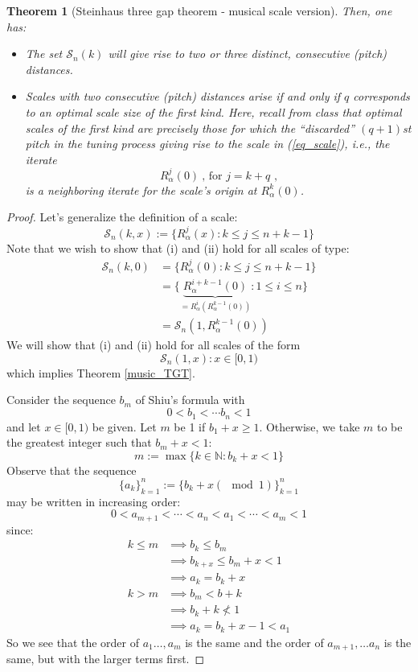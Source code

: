 \documentclass[12pt, reqno]{amsart}
\newtheorem{theorem}{Theorem}[section]
\theoremstyle{definition}
\theoremstyle{remark}
\begin{document}
\begin{itemize}
\begin{itemize}
\begin{theorem}[Steinhaus three gap theorem - musical scale version]
Then, one has:
\begin{itemize}
\item[(i)] The set $\mathcal{S}_n(k)$ will give rise to two or three distinct, consecutive (pitch) distances.
\item[(ii)] Scales with two consecutive (pitch) distances arise if and only if $q$ corresponds to an optimal scale size of the first kind. Here, recall from class that optimal scales of the first kind are precisely those for which the ``{\em{discarded}}'' $(q+1)$st pitch in the tuning process giving rise to the scale in (\ref{eq_scale}), i.e., the iterate
\begin{equation}
R_\alpha^j(0) ~\mbox{, for $j = k + q$ ,}
\end{equation}
is a neighboring iterate for the scale's origin at $R_\alpha^k(0)$.
\end{itemize}
\end{theorem}


\begin{proof}
    Let's generalize the definition of a scale: 
$$\mathcal{S}_{n}(k,x):=\{R_{\alpha}^{j}(x):k\le j\le n+k-1\}$$
Note that we wish to show that (i) and (ii) hold for all scales of type: 
\begin{align*}
\mathcal{S}_{n}(k,0)&=\{R_{\alpha}^{j}(0):k\le j\le n+k-1\}\\
&= \{\underbrace{R^{i+k-1}_{\alpha}(0)}_{=R^{i}_{\alpha}(R^{k-1}_{\alpha}(0))}:1\le i\le n\}\\
&= \mathcal{S}_{n}(1,R_{\alpha}^{k-1}(0))
\end{align*}
We will show that (i) and (ii) hold for all scales of the form $$\mathcal{S}_{n}(1,x):x\in[0,1)$$which implies Theorem \ref{music_TGT}. 
\vspace*{10 pt}

Consider the sequence $b_{m}$ of Shiu's formula with $$0<b_{1}<\cdots b_{n}<1$$and let $x\in [0,1)$ be given. Let $m$ be 1 if $b_{1}+x\ge1$. Otherwise, we take $m$ to be the greatest integer such that $b_{m}+x<1$:
$$
m:=\max\{k\in \mathbb{N}:b_{k}+x<1\}
$$
Observe that the sequence 
$$\{a_{k}\}_{k=1}^{n}:=\{b_{k}+x(\mod 1)\}_{k=1}^{n}$$
may be written in increasing order: 
$$
0<a_{m+1}<\cdots<a_{n}<a_{1}<\cdots<a_{m}<1
$$
since: 
\begin{align*}
k\le m&\implies b_{k}\le b_{m}\\
&\implies b_{k+x}\le b_{m}+x<1\\
&\implies a_{k}=b_{k}+x\\
k>m&\implies b_{m}<b+k \\
&\implies b_{k}+k \not<1\\
&\implies a_{k}=b_{k}+x-1<a_{1}
\end{align*}
So we see that the order of $a_{1}\ldots, a_{m}$ is the same and the order of $a_{m+1},\ldots a_{n}$ is the same, but with the larger terms first.


\end{proof}
\end{itemize}
\end{itemize}
\end{document}

